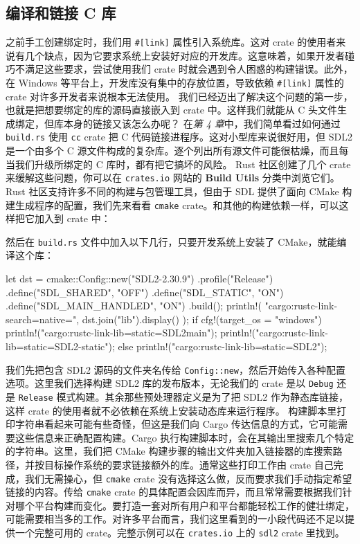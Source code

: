 \subsection{编译和链接 C 库}
\label{idx:idx_685c9210}
\label{idx:idx_3a02b707}
之前手工创建绑定时，我们用 \texttt{\#[link]} 属性引入系统库。这对 crate 的使用者来说有几个缺点，因为它要求系统上安装好对应的开发库。这意味着，如果开发者碰巧不满足这些要求，尝试使用我们 crate 时就会遇到令人困惑的构建错误。此外，在 Windows 等平台上，开发库没有集中的存放位置，导致依赖 \texttt{\#[link]} 属性的 crate 对许多开发者来说根本无法使用。
\label{idx:idx_1941ba74}
\label{idx:idx_7d59757b}
我们已经迈出了解决这个问题的第一步，也就是把想要绑定的库的源码直接嵌入到 crate 中。这样我们就能从 C 头文件生成绑定，但库本身的链接又该怎么办呢？
在\emph{第 4 章}中，我们简单看过如何通过 \texttt{build.rs} 使用 \texttt{cc} crate 把 C 代码链接进程序。这对小型库来说很好用，但 SDL2 是一个由多个 C 源文件构成的复杂库。逐个列出所有源文件可能很枯燥，而且每当我们升级所绑定的 C 库时，都有把它搞坏的风险。
\label{idx:idx_5bf2eb78}
Rust 社区创建了几个 crate 来缓解这些问题，你可以在 \texttt{crates.io} 网站的 \textbf{Build Utils} 分类中浏览它们。Rust 社区支持许多不同的构建与包管理工具，但由于 SDL 提供了面向 CMake 构建生成程序的配置，我们先来看看 \texttt{cmake} crate。和其他的构建依赖一样，可以这样把它加入到 crate 中：
然后在 \texttt{build.rs} 文件中加入以下几行，只要开发系统上安装了 CMake，就能编译这个库：
\begin{codebox}[rust]
let dst = cmake::Config::new("SDL2-2.30.9")
    .profile("Release")
    .define("SDL_SHARED", "OFF")
    .define("SDL_STATIC", "ON")
    .define("SDL_MAIN_HANDLED", "ON")
    .build();
println!(
    "cargo:rustc-link-search=native={}",
    dst.join("lib").display()
);
if cfg!(target_os = "windows") {
    println!("cargo:rustc-link-lib=static=SDL2main");
    println!("cargo:rustc-link-lib=static=SDL2-static");
} else {
    println!("cargo:rustc-link-lib=static=SDL2");
}
\end{codebox}
\label{idx:idx_c5ea0774}
\label{idx:idx_02c170ed}
我们先把包含 SDL2 源码的文件夹名传给 \texttt{Config::new}，然后开始传入各种配置选项。这里我们选择构建 SDL2 库的发布版本，无论我们的 crate 是以 \texttt{Debug} 还是 \texttt{Release} 模式构建。其余那些预处理器定义是为了把 SDL2 作为静态库链接，这样 crate 的使用者就不必依赖在系统上安装动态库来运行程序。
构建脚本里打印字符串看起来可能有些奇怪，但这是我们向 Cargo 传达信息的方式，它可能需要这些信息来正确配置构建。Cargo 执行构建脚本时，会在其输出里搜索几个特定的字符串。这里，我们把 CMake 构建步骤的输出文件夹加入链接器的库搜索路径，并按目标操作系统的要求链接额外的库。通常这些打印工作由 crate 自己完成，我们无需操心，但 \texttt{cmake} crate 没有选择这么做，反而要求我们手动指定希望链接的内容。传给 \texttt{cmake} crate 的具体配置会因库而异，而且常常需要根据我们针对哪个平台构建而变化。要打造一套对所有用户和平台都能轻松工作的健壮绑定，可能需要相当多的工作。对许多平台而言，我们这里看到的一小段代码还不足以提供一个完整可用的 crate。完整示例可以在 \texttt{crates.io} 上的 \texttt{sdl2} crate 里找到。
